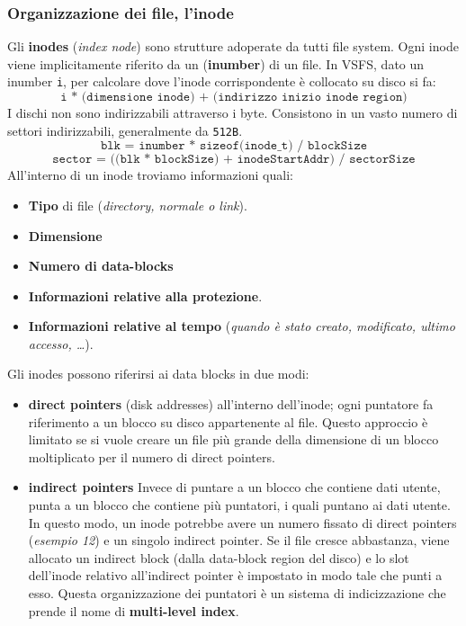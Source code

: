 \documentclass[12pt, twoside, letterpaper]{article}
\begin{document}
			\subsubsection{Organizzazione dei file, l'inode}
				Gli \textbf{inodes} (\textit{index node}) sono strutture adoperate da tutti file system. Ogni inode viene implicitamente riferito da un (\textbf{inumber}) di un file. In VSFS, dato un inumber \texttt{i}, per calcolare dove l'inode corrispondente è collocato su disco si fa: $$\texttt{i * (dimensione inode) + (indirizzo inizio inode region)}$$
				I dischi non sono indirizzabili attraverso i byte. Consistono in un vasto numero di settori indirizzabili, generalmente da \texttt{512B}. 
				$$\texttt{blk = inumber * sizeof(inode\_t) / blockSize}$$
				$$\texttt{sector = ((blk * blockSize) + inodeStartAddr) / sectorSize}$$
				All'interno di un inode troviamo informazioni quali: 
				\begin{itemize}
					\item \textbf{Tipo} di file (\textit{directory, normale o link}).
					\item \textbf{Dimensione}
					\item \textbf{Numero di data-blocks}
					\item \textbf{Informazioni relative alla protezione}.
					\item \textbf{Informazioni relative al tempo} (\textit{quando è stato creato, modificato, ultimo accesso, \dots}).
				\end{itemize}
				Gli inodes possono riferirsi ai data blocks in due modi:
				\begin{itemize}
					\item \textbf{direct pointers} (disk addresses) all'interno dell'inode; ogni puntatore fa riferimento a un blocco su disco appartenente al file. Questo approccio è limitato se si vuole creare un file più grande della dimensione di un blocco moltiplicato per il numero di direct pointers.
					\item \textbf{indirect pointers} Invece di puntare a un blocco che contiene dati utente, punta a un blocco che contiene più puntatori, i quali puntano ai dati utente. In questo modo, un inode potrebbe avere un numero fissato di direct pointers (\textit{esempio 12}) e un singolo indirect pointer. Se il file cresce abbastanza, viene allocato un indirect block (dalla data-block region del disco) e lo slot dell'inode relativo all'indirect pointer è impostato in modo tale che punti a esso. Questa organizzazione dei puntatori è un sistema di indicizzazione che prende il nome di \textbf{multi-level index}. 
				\end{itemize}
\end{document}
